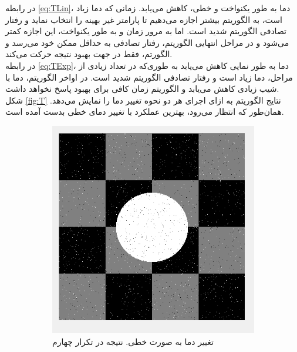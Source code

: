 \documentclass[11.5pt,a4paper]{article}
\begin{document}
در رابطه \ref{eq:TLin}، دما به طور یکنواخت و خطی،‌ کاهش می‌یابد. زمانی که دما زیاد است، به الگوریتم بیشتر اجازه می‌دهیم تا پارامتر غیر بهینه را انتخاب نماید و رفتار تصادفی الگوریتم شدید است. اما به مرور زمان و به طور یکنواخت،‌ این اجازه کمتر می‌شود و در مراحل انتهایی الگوریتم، رفتار تصادفی به حداقل ممکن خود می‌رسد و الگورتم، فقط در جهت بهبود نتیجه حرکت می‌کند.
\\
در رابطه \ref{eq:TExp}، دما به طور نمایی کاهش می‌یابد به طوری‌که در تعداد زیادی از مراحل،‌ دما زیاد است و رفتار تصادفی الگوریتم شدید است. در اواخر الگوریتم،‌ دما با شیب زیادی کاهش می‌یابد و الگوریتم زمان کافی برای بهبود پاسخ نخواهد داشت.\\
شکل 
\ref{fig:T}
نتایج الگوریتم به ازای اجرای هر دو نحوه تغییر دما را نمایش می‌دهد. همان‌طور که انتظار می‌رود، بهترین عملکرد با تغییر دمای خطی بدست‌ آمده است.
\begin{figure}[h]
\center
	\begin{subfigure}{0.4\textwidth}
	\includegraphics[scale=0.3]{Imgs/MRF_Iter4_TLin.png}
	\caption{تغییر دما به صورت خطی. نتیجه در تکرار چهارم}
	\end{subfigure}
	\begin{subfigure}{0.4\textwidth}

\end{subfigure}
\end{figure}
\end{document}
